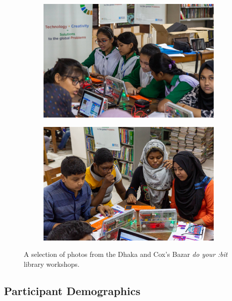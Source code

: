 \documentclass[12pt]{report} %
\newcommand{\DYB}{\textit{do your :bit }}
\begin{document}
\begin{figure}[t!]
        \begin{subfigure}[]{0.46\textwidth}
        \centering
        \includegraphics[width=1.0\textwidth]{dyb_coxsbazar_s_40}
    \end{subfigure}
    \begin{subfigure}[]{0.46\textwidth}
        \centering
        \includegraphics[width=1.0\textwidth]{dyb_coxsbazar_s_41}
    \end{subfigure}    
    \caption{A selection of photos from the Dhaka and Cox's Bazar \DYB library workshops.}
    \label{fig:photos}
\end{figure}

\newpage
\subsection{Participant Demographics} %
\end{document}
